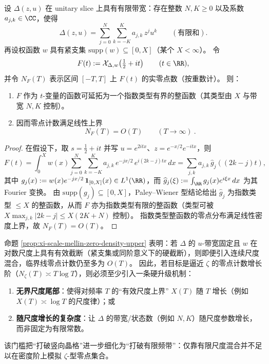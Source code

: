 \begin{proposition}[有限频带/有限尺度的零点密度上界：\texorpdfstring{$N(T)=O(T)$}{N(T)=O(T)}]\label{prop:xi-scale-mellin-zero-density-upper}
设 \(\Delta(z,u)\) 在 unitary slice 上具有有限带宽：存在整数 \(N,K\ge 0\) 以及系数 \(a_{j,k}\in\CC\)，使得
\[
\Delta(z,u)=\sum_{j=0}^{N}\sum_{k=-K}^{K} a_{j,k}\,z^j u^k
\qquad(\text{有限和}).
\]
再设权函数 \(w\) 具有紧支集 \(\mathrm{supp}(w)\subseteq [0,X]\)（某个 \(X<\infty\)）。
令
\[
F(t):=\mathcal X_{\Delta,w}\!\left(\tfrac12+it\right)\qquad(t\in\RR),
\]
并令 \(N_F(T)\) 表示区间 \([-T,T]\) 上 \(F(t)\) 的实零点数（按重数计）。
则：
\begin{enumerate}
  \item \(F\) 作为 \(t\)-变量的函数可延拓为一个指数类型有界的整函数（其类型由 \(X\) 与带宽 \(N,K\) 控制）。
  \item 因而零点计数满足线性上界
  \[
  \boxed{\ N_F(T)=O(T)\qquad(T\to\infty)\ }.
  \]
\end{enumerate}
\end{proposition}
\begin{proof}
在假设下，取 \(s=\tfrac12+it\) 并写 \(u=e^{2itx}\)、\(z=e^{-x/2}e^{-itx}\)，则
\[
F(t)=\int_0^X w(x)\sum_{j=0}^{N}\sum_{k=-K}^{K} a_{j,k}\,e^{-jx/2}\,e^{i(2k-j)tx}\,dx
=\sum_{j,k}a_{j,k}\,\widehat g_{j}( (2k-j)t),
\]
其中 \(g_j(x):=w(x)e^{-jx/2}\,\mathbf{1}_{[0,X]}(x)\in L^1(\RR)\)，而 \(\widehat g_j(\xi):=\int_{\RR} g_j(x)e^{i\xi x}\,dx\) 为其 Fourier 变换。
由 \(\mathrm{supp}(g_j)\subseteq[0,X]\)，Paley--Wiener 型结论给出 \(\widehat g_j\) 为指数类型 \(\le X\) 的整函数，从而 \(F\) 亦为指数类型有限的整函数（类型可被 \(X\max_{j,k}|2k-j|\le X(2K+N)\) 控制）。
指数类型整函数的零点分布满足线性密度上界，故 \(N_F(T)=O(T)\)。
\end{proof}

\begin{remark}\label{rem:xi-scale-mellin-density-threshold}
命题 \ref{prop:xi-scale-mellin-zero-density-upper} 表明：若 \(\Delta\) 的 \(u\)-带宽固定且 \(w\) 在对数尺度上具有有效截断（紧支集或同阶意义下的硬截断），则即便引入连续尺度混合，临界线零点计数仍至多为 \(O(T)\)。
因此，若目标是逼近 \(\zeta\) 的零点计数增长阶（\(N_\zeta(T)\asymp T\log T\)），则必须至少引入一条硬升级机制：
\begin{enumerate}
  \item \textbf{无界尺度尾部}：使得对频率 \(T\) 的“有效尺度上界” \(X(T)\) 随 \(T\) 增长（例如 \(X(T)\asymp \log T\) 的尺度律）；或
  \item \textbf{随尺度增长的复杂度}：让 \(\Delta\) 的带宽/状态数（例如 \(N,K\)）随尺度参数增长，而非固定为有限常数。
\end{enumerate}
该门槛把“打破竖向晶格”进一步细化为“打破有限频带”：仅靠有限尺度混合并不足以在密度阶上模拟 \(\zeta\)-型零点集合。
\end{remark}

